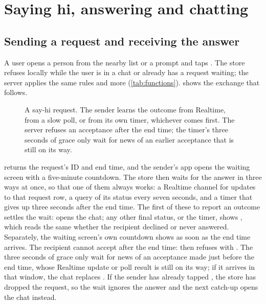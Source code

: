 \section{Saying hi, answering and chatting}
\label{sec:flow-sayhi}

\subsection{Sending a request and receiving the answer}

A user opens a person from the nearby list or a prompt and taps . The store refuses locally
while the user is in a chat or already has a request waiting; the server applies the same rules and more
(\cref{tab:functions}).  shows the exchange that follows.

\begin{figure}[ht]
  \centering
  
  \caption{A say-hi request. The sender learns the outcome from Realtime, from a slow poll, or from its
    own timer, whichever comes first. The server refuses an acceptance after the end time; the timer's
    three seconds of grace only wait for news of an earlier acceptance that is still on its way.}
  \label{fig:seq-request}
\end{figure}

 returns the request's ID and end time, and the sender's app opens the waiting
screen with a five-minute countdown. The store then waits for the answer in three ways at once, so that
one of them always works: a Realtime channel for updates to that request row, a query of its status every
seven seconds, and a timer that gives up three seconds after the end time. The first of these to report
an outcome settles the wait:  opens the chat; any other final status, or the timer, shows
, which reads the same whether the recipient declined or never answered. Separately,
the waiting screen's own countdown shows  as soon as the end time arrives. The recipient
cannot accept after the end time:  then refuses with . The three
seconds of grace only wait for news of an acceptance made just before the end time, whose Realtime update
or poll result is still on its way; if it arrives in that window, the chat replaces .
If the sender has already tapped , the store has dropped the request, so the
wait ignores the answer and the next catch-up opens the chat instead.

